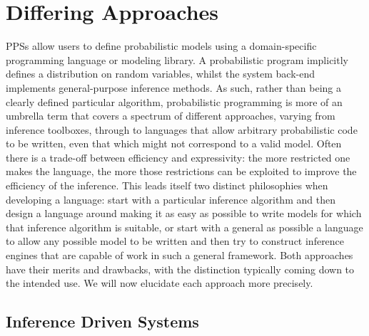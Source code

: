 
\section{Differing Approaches}
\label{sec:probprog:two}

PPSs allow users to define probabilistic models 
using a domain-specific programming language or modeling library. A probabilistic program implicitly 
defines a distribution on random variables, whilst the system back-end implements 
general-purpose inference methods.  As such, rather than being a clearly defined particular algorithm,
probabilistic programming is more of an umbrella term that covers a spectrum of 
different approaches, varying from inference toolboxes, through to languages that allow
arbitrary probabilistic code to be written, even that which might not correspond to a valid
model.  Often there is a trade-off between efficiency and expressivity: the more restricted
one makes the language, the more those restrictions can be exploited to improve the efficiency
of the inference.  This leads itself two distinct philosophies when developing a language: 
start with a particular inference algorithm and then design a language around making it as
easy as possible to write models for which that inference algorithm is suitable, or start with a
general as possible a language to allow any possible model to be written and then try to construct
inference engines that are capable of work in such a general framework.  Both approaches 
have their merits and drawbacks, with the distinction typically coming down to the intended use.
We will now elucidate each approach more precisely.  

\subsection{Inference Driven Systems}
\label{sec:probprog:two:inf}

